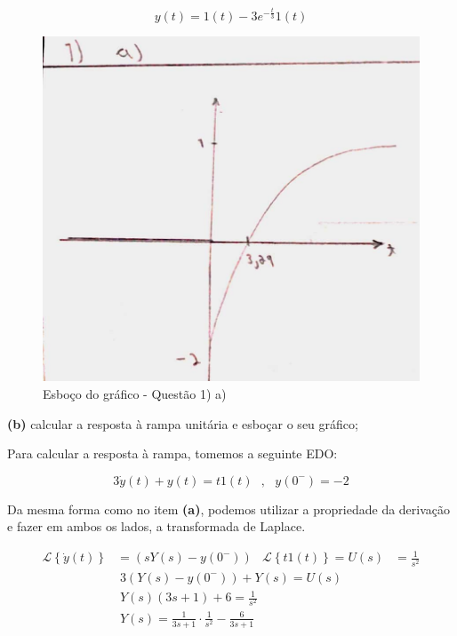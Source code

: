 \documentclass{article}
\begin{document}
\[y(t) = 1(t) - 3e^{-\frac{t}{3}}1(t)\]

\newpage

\begin{figure}[h]
    \includegraphics[scale=0.25]{Q1_a.png}
    \centering
    \caption{Esboço do gráfico - Questão 1) a)}
\end{figure}

\textbf{(b)} calcular a resposta à rampa unitária e esboçar o seu gráfico;

Para calcular a resposta à rampa, tomemos a seguinte EDO:

\[3\dot{y}(t) + y(t) = t1(t) \,\,\,\,,\,\,\,\,y(0^-) = -2\]

Da mesma forma como no item \textbf{(a)}, podemos utilizar a propriedade da derivação e fazer em ambos os lados, a transformada de Laplace.

\begin{align*}
    \mathcal{L}\left\{\dot{y}(t)\right\} &= \left(sY(s) - y(0^-)\right) & \mathcal{L}\left\{t1(t)\right\} = U(s) &= \frac{1}{s^2}
\end{align*}
\begin{align*}
    3(Y(s) - y(0^-)) + Y(s) = U(s)\\
    Y(s)(3s + 1) + 6 = \frac{1}{s^2}\\
    Y(s) = \frac{1}{3s + 1}\cdot\frac{1}{s^2} - \frac{6}{3s + 1}
\end{align*}
\end{document}
